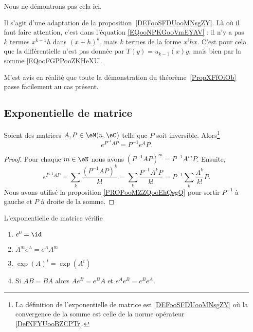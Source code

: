 \begin{normaltext}
	Nous ne démontrons pas cela ici.

	Il s'agit d'une adaptation de la proposition~\ref{DEFooSFDUooMNsgZY}. Là où il faut faire attention, c'est dans l'équation \eqref{EQooNPKGooVmEYAV} : il n'y a pas \( k\) termes \( x^{k-1}h\) dans \( (x+h)^k\), mais \( k\) termes de la forme \( x^ihx\). C'est pour cela que la différentielle n'est pas donnée par \( T(y)=u_{k-1}(x)y\), mais bien par la somme \eqref{EQooFGPPooZKHeXU}.

	M'est avis en réalité que toute la démonstration du théorème~\ref{PropXFfOiOb} passe facilement au cas présent.
\end{normaltext}

\subsection{Exponentielle de matrice}
\label{SECooBYQBooZifJsg}

\begin{proposition}
	Soient des matrices \( A,P\in \eM(n,\eC)\) telle que \( P\) soit inversible. Alors\footnote{La définition de l'exponentielle de matrice est \ref{DEFooSFDUooMNsgZY} où la convergence de la somme est celle de la norme opérateur \ref{DefNFYUooBZCPTr}.}
	\begin{equation}
		e^{P^{-1}AP}=P^{-1} e^{A}P.
	\end{equation}
\end{proposition}

\begin{proof}
	Pour chaque \( m\in \eN\) nous avons \( (P^{-1}AP)^m=P^{-1} A^mP\). Ensuite,
	\begin{equation}
		e^{P^{-1}AP}=\sum_k\frac{(P^{-1}AP)^k}{ k! }=\sum_k\frac{ P^{-1}A^kP }{ k! }=P^{-1}\sum_k\frac{ A^k }{ k! }P.
	\end{equation}
	Nous avons utilisé la proposition \ref{PROPooMZZQooEhQsgQ} pour sortir \( P^{-1}\) à gauche et \( P\) à droite de la somme.
\end{proof}

\begin{proposition}       \label{PROPooFLHPooRhLiZE}
	L'exponentielle de matrice vérifie
	\begin{enumerate}
		\item       \label{ITEMooCVALooEfLQCyI}
		      \( e^0=\id\)
		\item       \label{ITEMooNGPWooIyPEQt}
		      \( A^m e^{A}= e^{A}A^m\)
		\item       \label{ITEMooEOSMooQWjcjA}
            \( \exp(A)^t=\exp(A^t)\)
		\item       \label{ITEMooROPJooMarenu}
		      Si \( AB=BA\) alors \( A e^{B}= e^{B}A\) et \(  e^{A} e^{B}= e^{B} e^{A}\).
	\end{enumerate}
\end{proposition}

